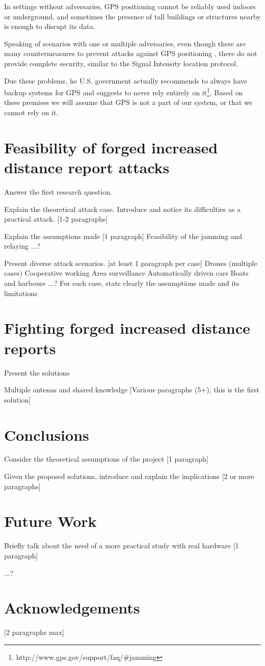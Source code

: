 \documentclass{article}
\begin{document}
In settings without adversaries, GPS positioning cannot be reliably used indoors or underground, and sometimes the presence of tall buildings or structures nearby is enough to disrupt its data.

Speaking of scenarios with one or multiple adversaries, even though there are many countermeasures to prevent attacks against GPS positioning \cite{warner2003gps, wen2005countermeasures, jafarnia2012gps}, there do not provide complete security, similar to the Signal Intensity location protocol.

Due these problems, he U.S. government actually recommends to always have backup systems for GPS and suggests to never rely entirely on it\footnote{http://www.gps.gov/support/faq/\#jamming}. Based on these premises we will assume that GPS is not a part of our system, or that we cannot rely on it.

\section{Feasibility of forged increased distance report attacks}

Answer the first research question.




Explain the theoretical attack case. Introduce and notice its difficulties as a practical attack. [1-2 paragraphs]

Explain the assumptions made [1 paragraph]
   Feasibility of the jamming and relaying
   ...?
   
Present diverse attack scenarios. [at least 1 paragraph per case]
   Drones (multiple cases)
     Cooperative working
     Area surveillance
   Automatically driven cars
   Boats and harbours
  ...?
For each case, state clearly the assumptions made and its limitations


\section{Fighting forged increased distance reports}

Present the solutions

Multiple antenas and shared knowledge [Various paragraphs (5+), this is the first solution]

\section{Conclusions}

Consider the theoretical assumptions of the project [1 paragraph]

Given the proposed solutions, introduce and explain the implications [2 or more paragraphs]

\section{Future Work}

Briefly talk about the need of a more practical study with real hardware [1 paragraph]

...?

\section{Acknowledgements}

[2 paragraphs max]

\printbibliography


\end{document}
